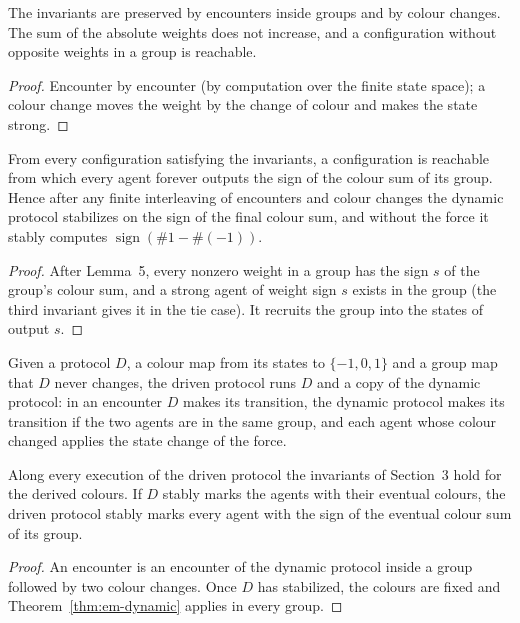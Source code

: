 \begin{lemma}\label{lem:em-dynamic}
\leanok{}
The invariants are preserved by encounters inside groups and by colour changes. The sum of the
absolute weights does not increase, and a configuration without opposite weights in a group is
reachable.
\end{lemma}
\begin{proof}\leanok
Encounter by encounter (by computation over the finite state space); a colour change moves the
weight by the change of colour and makes the state strong.
\end{proof}

\begin{theorem}\label{thm:em-dynamic}
\leanok{}
From every configuration satisfying the invariants, a configuration is reachable from which every
agent forever outputs the sign of the colour sum of its group. Hence after any finite interleaving
of encounters and colour changes the dynamic protocol stabilizes on the sign of the final colour
sum, and without the force it stably computes $\operatorname{sign}(\#1 - \#(-1))$.
\end{theorem}
\begin{proof}\leanok
After Lemma~5, every nonzero weight in a group has the sign $s$ of the group's colour sum, and a
strong agent of weight sign $s$ exists in the group (the third invariant gives it in the tie
case). It recruits the group into the states of output $s$.
\end{proof}

\begin{definition}\label{def:em-drive}
\leanok{}
Given a protocol $D$, a colour map from its states to $\{-1, 0, 1\}$ and a group map that $D$
never changes, the driven protocol runs $D$ and a copy of the dynamic protocol: in an encounter
$D$ makes its transition, the dynamic protocol makes its transition if the two agents are in the
same group, and each agent whose colour changed applies the state change of the force.
\end{definition}

\begin{theorem}[Composition]\label{thm:em-drive}
\leanok{}
Along every execution of the driven protocol the invariants of Section~3 hold for the derived
colours. If $D$ stably marks the agents with their eventual colours, the driven protocol stably
marks every agent with the sign of the eventual colour sum of its group.
\end{theorem}
\begin{proof}\leanok
An encounter is an encounter of the dynamic protocol inside a group followed by two colour
changes. Once $D$ has stabilized, the colours are fixed and Theorem~\ref{thm:em-dynamic} applies
in every group.
\end{proof}

